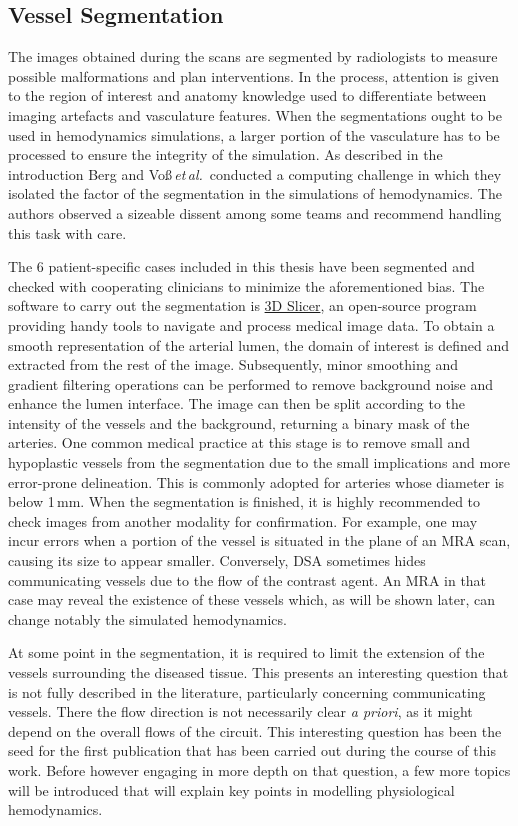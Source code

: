 \subsection{Vessel Segmentation}\label{chap3:sec1:subsec3}
The images obtained during the scans are segmented by radiologists to measure possible malformations and plan interventions. In the process, attention is given to the region of interest and anatomy knowledge used to differentiate between imaging artefacts and vasculature features. When the segmentations ought to be used in hemodynamics simulations, a larger portion of the vasculature has to be processed to ensure the integrity of the simulation. As described in the introduction Berg and Vo\ss\,\textit{et\,al.}\,\cite{Berg2018, voss2019} conducted a computing challenge in which they isolated the factor of the segmentation in the simulations of hemodynamics. The authors observed a sizeable dissent among some teams and recommend handling this task with care.

The 6 patient-specific cases included in this thesis have been segmented and checked with cooperating clinicians to minimize the aforementioned bias. The software to carry out the segmentation is \href{https://www.slicer.org/}{3D Slicer}, an open-source program providing handy tools to navigate and process medical image data. To obtain a smooth representation of the arterial lumen, the domain of interest is defined and extracted from the rest of the image. Subsequently, minor smoothing and gradient filtering operations can be performed to remove background noise and enhance the lumen interface. The image can then be split according to the intensity of the vessels and the background, returning a binary mask of the arteries. One common medical practice at this stage is to remove small and hypoplastic vessels from the segmentation due to the small implications and more error-prone delineation. This is commonly adopted for arteries whose diameter is below 1\,mm. When the segmentation is finished, it is highly recommended to check images from another modality for confirmation. For example, one may incur errors when a portion of the vessel is situated in the plane of an MRA scan, causing its size to appear smaller. Conversely, DSA sometimes hides communicating vessels due to the flow of the contrast agent. An MRA in that case may reveal the existence of these vessels which, as will be shown later, can change notably the simulated hemodynamics.

At some point in the segmentation, it is required to limit the extension of the vessels surrounding the diseased tissue. This presents an interesting question that is not fully described in the literature, particularly concerning communicating vessels. There the flow direction is not necessarily clear \textit{a priori}, as it might depend on the overall flows of the circuit. This interesting question has been the seed for the first publication that has been carried out during the course of this work. Before however engaging in more depth on that question, a few more topics will be introduced that will explain key points in modelling physiological hemodynamics.



